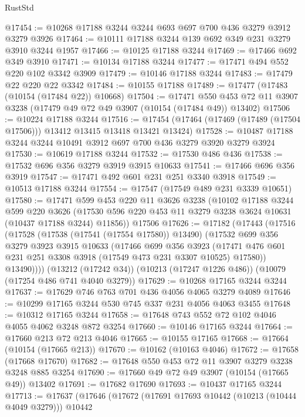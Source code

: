 \begin{lexlean}{RustStd}
\begin{coremodule}
@17454 := @10268 @17188 @3244 @3244 @693 @697 @700 @436 @3279 @3912 @3279 @3926
@17464 := @10111 @17188 @3244 @139 @692 @349 @231 @3279 @3910 @3244 @1957
@17466 := @10125 @17188 @3244
@17469 := @17466 @692 @349 @3910
@17471 := @10134 @17188 @3244
@17477 := @17471 @494 @552 @220 @102 @3342 @3909
@17479 := @10146 @17188 @3244
@17483 := @17479 @22 @220 @22 @3342
@17484 := @10155 @17188
@17489 := @17477 (@17483 (@10154 (@17484 @22)) @10668)
@17504 := @17471
    @550
    @453
    @72
    @11
    @3907
    @3238
    (@17479 @49 @72 @49 @3907 (@10154 (@17484 @49)) @13402)
@17506 := @10224 @17188 @3244
@17516 := @17454 (@17464 (@17469 (@17489 (@17504 @17506))) @13412 @13415 @13418 @13421 @13424)
@17528 := @10487 @17188 @3244 @3244 @10491 @3912 @697 @700 @436 @3279 @3920 @3279 @3924
@17530 := @10619 @17188 @3244
@17532 := @17530 @486 @436
@17538 := @17532 @696 @356 @3279 @3919 @3915 @10633
@17541 := @17466 @696 @356 @3919
@17547 := @17471 @492 @601 @231 @251 @3340 @3918
@17549 := @10513 @17188 @3244
@17554 := @17547 (@17549 @489 @231 @3339 @10651)
@17580 := @17471
    @599
    @453
    @220
    @11
    @3626
    @3238
    (@10102
      @17188
      @3244
      @599
      @220
      @3626
      (@17530 @596 @220 @453 @11 @3279 @3238 @3624 @10631 (@10437 @17188 @3244) @11856))
    @17506
@17626 := @17182
    (@17443
      (@17516
        (@17528
          (@17538 (@17541 (@17554 @17580)) @13490)
          (@17532
            @699
            @356
            @3279
            @3923
            @3915
            @10633
            (@17466
              @699
              @356
              @3923
              (@17471 @476 @601 @231 @251 @3308 @3918 (@17549 @473 @231 @3307 @10525) @17580))
            @13490))))
    (@13212 (@17242 @34))
    (@10213 (@17247 @1226 @486))
    (@10079 (@17254 @486 @741 @4040 @3279))
@17629 := @10268 @17165 @3244 @3244
@17637 := @17629 @746 @763 @701 @436 @4056 @4065 @3279 @4089
@17646 := @10299 @17165 @3244 @530 @745 @337 @231 @4056 @4063 @3455
@17648 := @10312 @17165 @3244
@17658 := @17648 @743 @552 @72 @102 @4046 @4055 @4062 @3248 @872 @3254
@17660 := @10146 @17165 @3244
@17664 := @17660 @213 @72 @213 @4046
@17665 := @10155 @17165
@17668 := @17664 (@10154 (@17665 @213))
@17670 := @10162 (@10163 @4046)
@17672 := @17658 (@17668 @17670)
@17682 := @17648 @550 @453 @72 @11 @3907 @3279 @3238 @3248 @885 @3254
@17690 := @17660 @49 @72 @49 @3907 (@10154 (@17665 @49)) @13402
@17691 := @17682 @17690
@17693 := @10437 @17165 @3244
@17713 := @17637
    (@17646
      (@17672
        (@17691 @17693 @10442 (@10213 (@10444 @4049 @3279)))
        @10442

\end{coremodule}
\end{lexlean}
